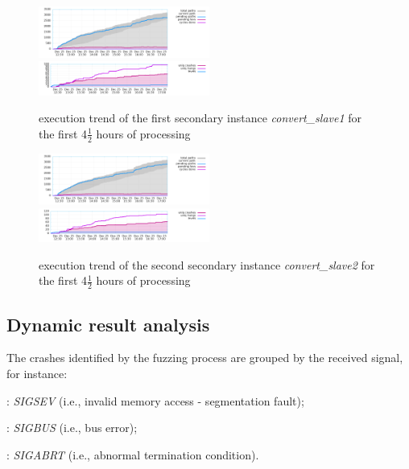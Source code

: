 \begin{figure}[H]
    \centering
    \includegraphics[width=0.5\textwidth]{Resources/convert_slave1/high_freq.png}\hfill
    \includegraphics[width=0.5\textwidth]{Resources/convert_slave1/low_freq.png}
    \caption{execution trend of the first secondary instance \textit{convert\_slave1} for the first 4$\frac{1}{2}$ hours of processing}
    \label{fig:convert_slave1}
\end{figure}

\begin{figure}[H]
    \centering
    \includegraphics[width=0.5\textwidth]{Resources/convert_slave2/high_freq.png}\hfill
    \includegraphics[width=0.5\textwidth]{Resources/convert_slave2/low_freq.png}
    \caption{execution trend of the second secondary instance \textit{convert\_slave2} for the first 4$\frac{1}{2}$ hours of processing}
    \label{fig:convert_slave2}
\end{figure}

\subsection{Dynamic result analysis}
The crashes identified by the fuzzing process are grouped by the received signal, for instance\parencite{signals}:
\begin{description}[itemsep=0.5pt]
    \item[sig$\cdot$11]: \textit{SIGSEV} (i.e., invalid memory access - segmentation fault);
    \item[sig$\cdot$07]: \textit{SIGBUS} (i.e., bus error);
    \item[sig$\cdot$06]: \textit{SIGABRT} (i.e., abnormal termination condition).
\end{description}

